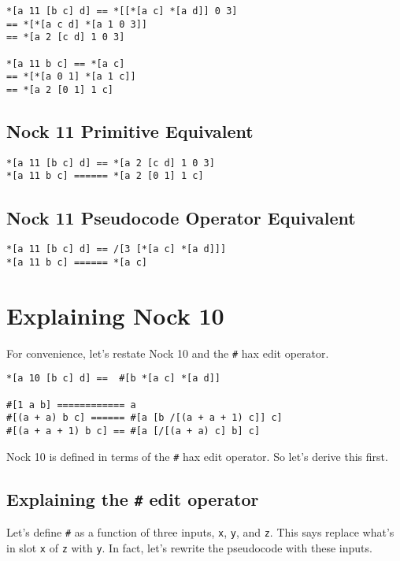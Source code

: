 \documentclass[twoside]{article}
\begin{document}
\begin{lstlisting}[style=listingblock]
*[a 11 [b c] d] == *[[*[a c] *[a d]] 0 3]
== *[*[a c d] *[a 1 0 3]]
== *[a 2 [c d] 1 0 3]

*[a 11 b c] == *[a c]
== *[*[a 0 1] *[a 1 c]]
== *[a 2 [0 1] 1 c]
\end{lstlisting}

\subsection*{Nock 11 Primitive Equivalent}

\begin{lstlisting}[style=listingcode]
*[a 11 [b c] d] == *[a 2 [c d] 1 0 3]
*[a 11 b c] ====== *[a 2 [0 1] 1 c]
\end{lstlisting}

\subsection*{Nock 11 Pseudocode Operator Equivalent}

\begin{lstlisting}[style=listingcode]
*[a 11 [b c] d] == /[3 [*[a c] *[a d]]]
*[a 11 b c] ====== *[a c]
\end{lstlisting}

\section{Explaining Nock 10}

For convenience, let's restate Nock 10 and the \lstinline[style=inlinecode]{#} hax edit operator.

\begin{lstlisting}[style=listingcode]
*[a 10 [b c] d] ==  #[b *[a c] *[a d]]

#[1 a b] ============ a
#[(a + a) b c] ====== #[a [b /[(a + a + 1) c]] c]
#[(a + a + 1) b c] == #[a [/[(a + a) c] b] c]
\end{lstlisting}

Nock 10 is defined in terms of the \lstinline[style=inlinecode]{#} hax edit operator. So let's derive this first.

\subsection{Explaining the \texttt{\#} edit operator}

Let's define \lstinline[style=inlinecode]{#} as a function of three inputs, \lstinline[style=inlinecode]{x}, \lstinline[style=inlinecode]{y}, and \lstinline[style=inlinecode]{z}. This says replace what's in slot \lstinline[style=inlinecode]{x} of \lstinline[style=inlinecode]{z} with \lstinline[style=inlinecode]{y}. In fact, let's rewrite the pseudocode with these inputs.
\end{document}
